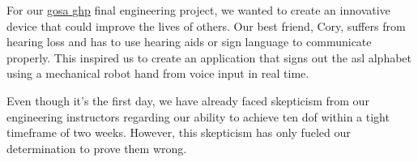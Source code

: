 
For our \href{https://gosa.georgia.gov/governors-honors-program}{\gls{gosa} \gls{ghp}} final engineering project, we wanted to create an innovative device that could improve the lives of others. Our best friend, Cory, suffers from hearing loss and has to use hearing aids or sign language to communicate properly. This inspired us to create an application that signs out the \gls{asl} alphabet using a mechanical robot hand from voice input in real time.

Even though it's the first day, we have already faced skepticism from our engineering instructors regarding our ability to achieve ten \gls{dof} within a tight timeframe of two weeks. However, this skepticism has only fueled our determination to prove them wrong.

